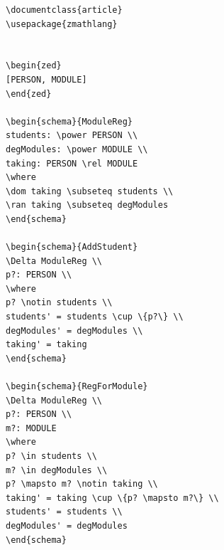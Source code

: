 \begin{figure}[H]
\vspace{-0.2in}
\centering
\begin{minipage}{0.45\textwidth}
\centering
\begin{tiny}
\begin{BVerbatim}
\documentclass{article}
\usepackage{zmathlang}


\begin{zed}
[PERSON, MODULE]
\end{zed}

\begin{schema}{ModuleReg}
students: \power PERSON \\
degModules: \power MODULE \\
taking: PERSON \rel MODULE
\where
\dom taking \subseteq students \\
\ran taking \subseteq degModules
\end{schema}

\begin{schema}{AddStudent}
\Delta ModuleReg \\
p?: PERSON \\
\where
p? \notin students \\
students' = students \cup \{p?\} \\
degModules' = degModules \\
taking' = taking
\end{schema}

\begin{schema}{RegForModule}
\Delta ModuleReg \\
p?: PERSON \\
m?: MODULE
\where
p? \in students \\
m? \in degModules \\
p? \mapsto m? \notin taking \\
taking' = taking \cup \{p? \mapsto m?\} \\
students' = students \\
degModules' = degModules
\end{schema}


\end{BVerbatim}
\end{tiny}
\end{minipage}
\end{figure}
